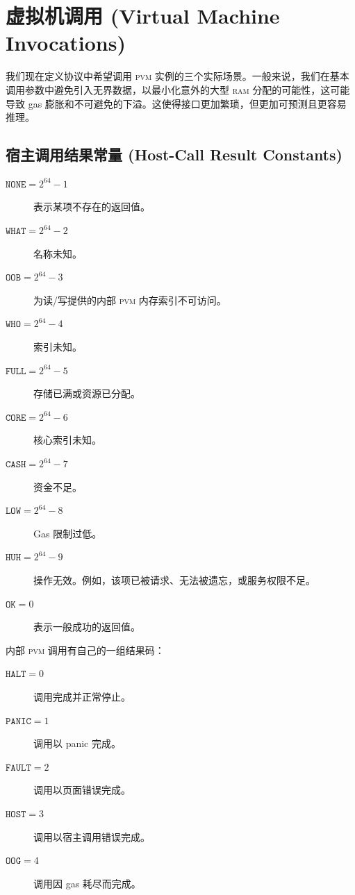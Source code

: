 \section{虚拟机调用 (Virtual Machine Invocations)}\label{sec:virtualmachineinvocations}

我们现在定义协议中希望调用 \textsc{pvm} 实例的三个实际场景。一般来说，我们在基本调用参数中避免引入无界数据，以最小化意外的大型 \textsc{ram} 分配的可能性，这可能导致 gas 膨胀和不可避免的下溢。这使得接口更加繁琐，但更加可预测且更容易推理。

\subsection{宿主调用结果常量 (Host-Call Result Constants)}

\begin{description}
  \item[$\mathtt{NONE} = 2^{64} - 1$] 表示某项不存在的返回值。
  \item[$\mathtt{WHAT} = 2^{64} - 2$] 名称未知。
  \item[$\mathtt{OOB} = 2^{64} - 3$] 为读/写提供的内部 \textsc{pvm} 内存索引不可访问。
  \item[$\mathtt{WHO} = 2^{64} - 4$] 索引未知。
  \item[$\mathtt{FULL} = 2^{64} - 5$] 存储已满或资源已分配。
  \item[$\mathtt{CORE} = 2^{64} - 6$] 核心索引未知。
  \item[$\mathtt{CASH} = 2^{64} - 7$] 资金不足。
  \item[$\mathtt{LOW} = 2^{64} - 8$] Gas 限制过低。
  \item[$\mathtt{HUH} = 2^{64} - 9$] 操作无效。例如，该项已被请求、无法被遗忘，或服务权限不足。
  \item[$\mathtt{OK} = 0$] 表示一般成功的返回值。
\end{description}

内部 \textsc{pvm} 调用有自己的一组结果码：
\begin{description}
  \item[$\mathtt{HALT} = 0$] 调用完成并正常停止。
  \item[$\mathtt{PANIC} = 1$] 调用以 panic 完成。
  \item[$\mathtt{FAULT} = 2$] 调用以页面错误完成。
  \item[$\mathtt{HOST} = 3$] 调用以宿主调用错误完成。
  \item[$\mathtt{OOG} = 4$] 调用因 gas 耗尽而完成。
\end{description}

